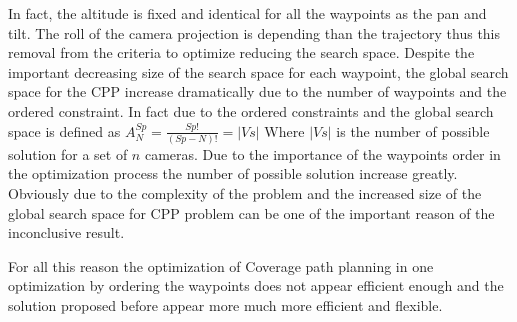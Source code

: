 \begin{itemize}
	 In fact, the altitude is fixed and identical for all the waypoints as the pan and tilt. The roll of the camera projection is depending than the trajectory thus this removal from the criteria to optimize reducing the search space.
		Despite the important decreasing size of the search space for each waypoint, the global search space for the CPP increase dramatically  due to the number of waypoints and the ordered constraint. In fact due to the ordered constraints and the global search space is defined as $A^{Sp}_{N}=\frac{Sp!}{(Sp-N)!} = |Vs|$
 Where $|Vs|$ is the number of possible solution for a set of $n$ cameras. Due to the importance of the waypoints order in the optimization process the number of possible solution increase greatly. Obviously due to the complexity of the problem and the increased size of the global search space for CPP problem  can be one of the important reason of the inconclusive result.
 \end{itemize}
		
For all this reason the  optimization of Coverage path planning  in one optimization by ordering the waypoints does not appear efficient enough and the solution proposed before appear more much more efficient and flexible.






